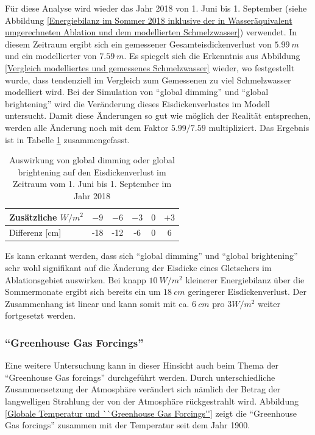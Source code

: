 \documentclass[11pt,a4paper]{article}
\begin{document}
Für diese Analyse wird wieder das Jahr 2018 von 1. Juni bis 1. September (siehe Abbildung \ref{Energiebilanz im Sommer 2018 inklusive der in Wasseräquivalent umgerechneten Ablation und dem modellierten Schmelzwasser}) verwendet. In diesem Zeitraum ergibt sich ein gemessener Gesamteisdickenverlust von $5.99~m$ und ein modellierter von $7.59~m$. Es spiegelt sich die Erkenntnis aus Abbildung \ref{Vergleich modelliertes und gemessenes Schmelzwasser} wieder, wo festgestellt wurde, dass tendenziell im Vergleich zum Gemessenen zu viel Schmelzwasser modelliert wird. Bei der Simulation von ``global dimming'' und ``global brightening'' wird die Veränderung dieses Eisdickenverlustes im Modell untersucht. Damit diese Änderungen so gut wie möglich der Realität entsprechen, werden alle Änderung noch mit dem Faktor $5.99/7.59$ multipliziert. Das Ergebnis ist in Tabelle \ref{tab:Auswirkung von global dimming oder global brightening auf den Eisdickenverlust innerhalb vom 1. Juni bis 1. September im Jahr 2018} zusammengefasst.

\begin{table}[H]
\centering
{} 
\caption{Auswirkung von global dimming oder global brightening auf den Eisdickenverlust im Zeitraum vom 1. Juni bis 1. September im Jahr 2018}
\label{tab:Auswirkung von global dimming oder global brightening auf den Eisdickenverlust innerhalb vom 1. Juni bis 1. September im Jahr 2018}
\begin{tabular}{|l|c|c|c|c|c|}
\hline
Zusätzliche $W/m^2$       &  $-9$ & $-6$  & $-3$ & $0$ & $+3$ \\ \hline
Differenz {[}cm{]} & -18    & -12 & -6 & 0  & 6  \\ \hline
\end{tabular}
\end{table}

Es kann erkannt werden, dass sich ``global dimming'' und ``global brightening'' sehr wohl signifikant auf die Änderung der Eisdicke eines Gletschers im Ablationsgebiet auswirken. Bei knapp $10~W/m^2$ kleinerer Energiebilanz über  die Sommermonate ergibt sich bereits ein um $18~cm$ geringerer Eisdickenverlust. Der Zusammenhang ist linear und kann somit mit ca. $6~cm$ pro $3 W/m^2$ weiter fortgesetzt werden.\\

\subsubsection{``Greenhouse Gas Forcings''}
Eine weitere Untersuchung kann in dieser Hinsicht auch beim Thema der ``Greenhouse Gas forcings'' durchgeführt werden. Durch unterschiedliche Zusammensetzung der Atmosphäre verändert sich nämlich der Betrag der langwelligen Strahlung der von der Atmosphäre rückgestrahlt wird. Abbildung \ref{Globale Temperatur und ``Greenhouse Gas Forcings''} zeigt die ``Greenhouse Gas forcings'' zusammen mit der Temperatur seit dem Jahr 1900. 
\end{document}
